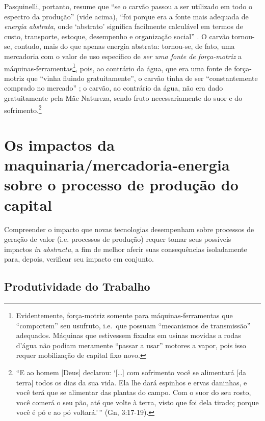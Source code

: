 Pasquinelli, portanto, resume que ``se o carvão passou a ser utilizado em todo o espectro da produção'' (vide acima), ``foi porque era a fonte mais adequada de \textit{energia abstrata}, onde `abstrato' significa facilmente calculável em termos de custo, transporte, estoque, desempenho e organização social'' \parencite[, p. 122-3, grifo no original]{Pasquinelli2023}. O carvão tornou-se, contudo, mais do que apenas energia abstrata: tornou-se, de fato, uma mercadoria com o valor de uso específico de \textit{ser uma fonte de força-motriz} a máquinas-ferramentas\footnote{Evidentemente, força-motriz somente para máquinas-ferramentas que ``comportem'' seu usufruto, i.e.~que possuam ``mecanismos de transmissão'' adequados. Máquinas que estivessem fixadas em usinas movidas a rodas d'água não podiam meramente ``passar a usar'' motores a vapor, pois isso requer mobilização de capital fixo novo.}, pois, ao contrário da água, que era uma fonte de força-motriz que ``vinha fluindo gratuitamente'', o carvão tinha de ser ``constantemente comprado no mercado'' \parencite[, p. 29]{Malm2013}; o carvão, ao contrário da água, não era dado gratuitamente pela Mãe Natureza, sendo fruto necessariamente do suor e do sofrimento.\footnote{``E ao homem {[}Deus{]} declarou: `{[}\ldots{]} com sofrimento você se alimentará {[}da terra{]} todos os dias da sua vida. Ela lhe dará espinhos e ervas daninhas, e você terá que se alimentar das plantas do campo. Com o suor do seu rosto, você comerá o seu pão, até que volte à terra, visto que foi dela tirado; porque você é pó e ao pó voltará.'\,'' (Gn, 3:17-19).}

\hypertarget{os-impactos-da-maquinariamercadoria-energia-sobre-o-processo-de-produuxe7uxe3o-do-capital}{%
\section{Os impactos da maquinaria/mercadoria-energia sobre o processo de produção do capital}\label{os-impactos-da-maquinariamercadoria-energia-sobre-o-processo-de-produuxe7uxe3o-do-capital}}
Compreender o impacto que novas tecnologias desempenham sobre processos de geração de valor (i.e. processos de produção) requer tomar seus possíveis impactos \textit{in abstractu}, a fim de melhor aferir suas consequências isoladamente para, depois, verificar seu impacto em conjunto.

\hypertarget{produtividade-do-trabalho}{%
\subsection{Produtividade do Trabalho}\label{produtividade-do-trabalho}}

